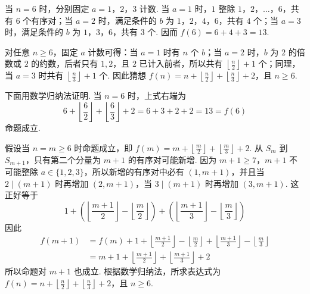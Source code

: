 \begin{solution}
当 \(n=6\) 时，分别固定 \(a=1\)，\(2\)，\(3\) 计数. 当 \(a=1\) 时，\(1\) 整除 \(1\)，\(2\)，\(\ldots\)，\(6\)，共有 \(6\) 个有序对；当 \(a=2\) 时，满足条件的 \(b\) 为 \(1\)，\(2\)，\(4\)，\(6\)，共有 \(4\) 个；当 \(a=3\) 时，满足条件的 \(b\) 为 \(1\)，\(3\)，\(6\)，共有 \(3\) 个. 因而 \(f(6)=6+4+3=13\).

对任意 \(n\geqslant6\)，固定 \(a\) 计数可得：当 \(a=1\) 时有 \(n\) 个 \(b\)；当 \(a=2\) 时，\(b\) 为 \(2\) 的倍数或 \(2\) 的约数，后者只有 \(1,2\)，且 \(2\) 已计入前者，所以共有 \(\left\lfloor\frac n2\right\rfloor+1\) 个；同理，当 \(a=3\) 时共有 \(\left\lfloor\frac n3\right\rfloor+1\) 个. 因此猜想
\(f(n)=n+\left\lfloor\frac n2\right\rfloor+\left\lfloor\frac n3\right\rfloor+2\)，且 \(n\geqslant6\).

下面用数学归纳法证明. 当 \(n=6\) 时，上式右端为
\[
6+\left\lfloor\frac62\right\rfloor+\left\lfloor\frac63\right\rfloor+2=6+3+2+2=13=f(6)
\]
命题成立.

假设当 \(n=m\geqslant6\) 时命题成立，即 \(f(m)=m+\left\lfloor\frac m2\right\rfloor+\left\lfloor\frac m3\right\rfloor+2\).
从 \(S_m\) 到 \(S_{m+1}\)，只有第二个分量为 \(m+1\) 的有序对可能新增. 因为 \(m+1\geqslant7\)，\(m+1\) 不可能整除 \(a\in\{1,2,3\}\)，所以新增的有序对中必有 \((1,m+1)\)，并且当 \(2\mid(m+1)\) 时再增加 \((2,m+1)\)，当 \(3\mid(m+1)\) 时再增加 \((3,m+1)\). 这正好等于
\[
1+\left(\left\lfloor\frac{m+1}{2}\right\rfloor-\left\lfloor\frac m2\right\rfloor\right)
+\left(\left\lfloor\frac{m+1}{3}\right\rfloor-\left\lfloor\frac m3\right\rfloor\right)
\]
因此
\[
\begin{aligned}
f(m+1)
&=f(m)+1+\left\lfloor\frac{m+1}{2}\right\rfloor-\left\lfloor\frac m2\right\rfloor
+\left\lfloor\frac{m+1}{3}\right\rfloor-\left\lfloor\frac m3\right\rfloor\\
&=m+1+\left\lfloor\frac{m+1}{2}\right\rfloor+\left\lfloor\frac{m+1}{3}\right\rfloor+2
\end{aligned}
\]
所以命题对 \(m+1\) 也成立. 根据数学归纳法，所求表达式为
\(f(n)=n+\left\lfloor\frac n2\right\rfloor+\left\lfloor\frac n3\right\rfloor+2\)，且 \(n\geqslant6\).
\end{solution}
